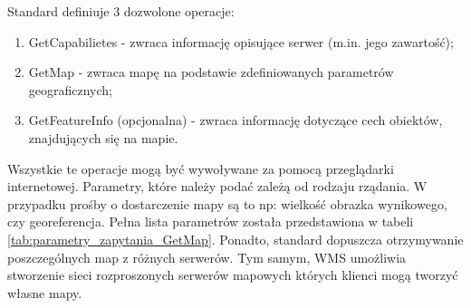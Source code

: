 Standard definiuje 3 dozwolone operacje: 
\begin{enumerate}
    \item GetCapabilietes - zwraca informację opisujące serwer (m.in. jego zawartość);
    \item GetMap - zwraca mapę na podstawie zdefiniowanych parametrów geograficznych;
    \item GetFeatureInfo (opcjonalna) - zwraca informację dotyczące cech obiektów, znajdujących się na mapie.
\end{enumerate}
Wszystkie te operacje mogą być wywoływane za pomocą przeglądarki internetowej. Parametry, które należy podać zależą od rodzaju rządania.
W przypadku prośby o dostarczenie mapy są to np: wielkość obrazka wynikowego, czy georeferencja. Pełna lista parametrów
została przedstawiona w tabeli \ref{tab:parametry_zapytania_GetMap}. Ponadto, standard dopuszcza otrzymywanie poszczególnych map z różnych serwerów.
Tym samym, WMS umożliwia stworzenie sieci rozproszonych serwerów mapowych których klienci mogą tworzyć własne mapy. \\

